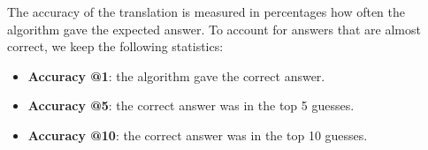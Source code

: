 The accuracy of the translation is measured in percentages how often the algorithm gave the expected answer. To account for answers that are almost correct, we keep the following statistics:
\begin{itemize}
	\item \textbf{Accuracy @1}: the algorithm gave the correct answer.
	\item \textbf{Accuracy @5}: the correct answer was in the top 5 guesses.
	\item \textbf{Accuracy @10}: the correct answer was in the top 10 guesses.
\end{itemize}